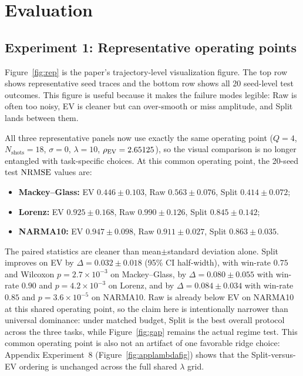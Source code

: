 \section{Evaluation}
\label{sec:evaluation}

\subsection{Experiment 1: Representative operating points}

Figure~\ref{fig:rep} is the paper's trajectory-level visualization figure. The top row shows representative seed traces and the bottom row shows all 20 seed-level test outcomes. This figure is useful because it makes the failure modes legible: Raw is often too noisy, EV is cleaner but can over-smooth or miss amplitude, and Split lands between them.

All three representative panels now use exactly the same operating point ($Q=4$, $N_{\mathrm{shots}}=18$, $\sigma=0$, $\lambda=10$, $\rho_{\mathrm{EV}}=2.65125$), so the visual comparison is no longer entangled with task-specific choices. At this common operating point, the 20-seed test $\mathrm{NRMSE}$ values are:
\begin{itemize}[leftmargin=*]
    \item \textbf{Mackey--Glass:} EV $0.446\pm0.103$, Raw $0.563\pm0.076$, Split $0.414\pm0.072$;
    \item \textbf{Lorenz:} EV $0.925\pm0.168$, Raw $0.990\pm0.126$, Split $0.845\pm0.142$;
    \item \textbf{NARMA10:} EV $0.947\pm0.098$, Raw $0.911\pm0.027$, Split $0.863\pm0.035$.
\end{itemize}
The paired statistics are cleaner than mean$\pm$standard deviation alone. Split improves on EV by $\Delta=0.032\pm0.018$ (95\% CI half-width), with win-rate $0.75$ and Wilcoxon $p=2.7\times10^{-3}$ on Mackey--Glass, by $\Delta=0.080\pm0.055$ with win-rate $0.90$ and $p=4.2\times10^{-3}$ on Lorenz, and by $\Delta=0.084\pm0.034$ with win-rate $0.85$ and $p=3.6\times10^{-5}$ on NARMA10. Raw is already below EV on NARMA10 at this shared operating point, so the claim here is intentionally narrower than universal dominance: under matched budget, Split is the best overall protocol across the three tasks, while Figure~\ref{fig:gap} remains the actual regime test. This common operating point is also not an artifact of one favorable ridge choice: Appendix Experiment~8 (Figure~\ref{fig:applambdafig}) shows that the Split-versus-EV ordering is unchanged across the full shared $\lambda$ grid.

